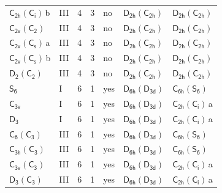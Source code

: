 \documentclass[10pt,a4paper]{article}
\numberwithin{equation}{section}
\newcommand{\grp}[1]{\mathsf{#1}}
\newcommand{\clsletter}[1]{\,{\scriptsize\color{black!55}#1}}
\begin{document}
{\begin{longtable}{@{}llrrlll@{}}
\href{C2h-S2.pdf}{$\grp{C_{2h}}(\grp{C_{i}})$}\clsletter{b} & III & 4 & 3 & no & \href{D2h-C2h.pdf}{$\grp{D_{2h}}(\grp{C_{2h}})$} & \href{D2h-C2h.pdf}{$\grp{D_{2h}}(\grp{C_{2h}})$}\\
\href{C2v-C2.pdf}{$\grp{C_{2v}}(\grp{C_{2}})$} & III & 4 & 3 & no & \href{D2h-C2h.pdf}{$\grp{D_{2h}}(\grp{C_{2h}})$} & \href{D2h-C2h.pdf}{$\grp{D_{2h}}(\grp{C_{2h}})$}\\
\href{C2v-C1v.pdf}{$\grp{C_{2v}}(\grp{C_{s}})$}\clsletter{a} & III & 4 & 3 & no & \href{D2h-C2h.pdf}{$\grp{D_{2h}}(\grp{C_{2h}})$} & \href{D2h-C2h.pdf}{$\grp{D_{2h}}(\grp{C_{2h}})$}\\
\href{C2v-C1v.pdf}{$\grp{C_{2v}}(\grp{C_{s}})$}\clsletter{b} & III & 4 & 3 & no & \href{D2h-C2h.pdf}{$\grp{D_{2h}}(\grp{C_{2h}})$} & \href{D2h-C2h.pdf}{$\grp{D_{2h}}(\grp{C_{2h}})$}\\
\href{D2-C2.pdf}{$\grp{D_{2}}(\grp{C_{2}})$} & III & 4 & 3 & no & \href{D2h-C2h.pdf}{$\grp{D_{2h}}(\grp{C_{2h}})$} & \href{D2h-C2h.pdf}{$\grp{D_{2h}}(\grp{C_{2h}})$}\\
\href{../../../rotation/data/pdf/S6.pdf}{$\grp{S_{6}}$} & I & 6 & 1 & yes & \href{D6h-D3d.pdf}{$\grp{D_{6h}}(\grp{D_{3d}})$} & \href{C6h-S6.pdf}{$\grp{C_{6h}}(\grp{S_{6}})$}\\
\href{../../../rotation/data/pdf/C3v.pdf}{$\grp{C_{3v}}$} & I & 6 & 1 & yes & \href{D6h-D3d.pdf}{$\grp{D_{6h}}(\grp{D_{3d}})$} & \href{C2h-S2.pdf}{$\grp{C_{2h}}(\grp{C_{i}})$}\clsletter{a}\\
\href{../../../rotation/data/pdf/D3.pdf}{$\grp{D_{3}}$} & I & 6 & 1 & yes & \href{D6h-D3d.pdf}{$\grp{D_{6h}}(\grp{D_{3d}})$} & \href{C2h-S2.pdf}{$\grp{C_{2h}}(\grp{C_{i}})$}\clsletter{a}\\
\href{C6-C3.pdf}{$\grp{C_{6}}(\grp{C_{3}})$} & III & 6 & 1 & yes & \href{D6h-D3d.pdf}{$\grp{D_{6h}}(\grp{D_{3d}})$} & \href{C6h-S6.pdf}{$\grp{C_{6h}}(\grp{S_{6}})$}\\
\href{C3h-C3.pdf}{$\grp{C_{3h}}(\grp{C_{3}})$} & III & 6 & 1 & yes & \href{D6h-D3d.pdf}{$\grp{D_{6h}}(\grp{D_{3d}})$} & \href{C6h-S6.pdf}{$\grp{C_{6h}}(\grp{S_{6}})$}\\
\href{C3v-C3.pdf}{$\grp{C_{3v}}(\grp{C_{3}})$} & III & 6 & 1 & yes & \href{D6h-D3d.pdf}{$\grp{D_{6h}}(\grp{D_{3d}})$} & \href{C2h-S2.pdf}{$\grp{C_{2h}}(\grp{C_{i}})$}\clsletter{a}\\
\href{D3-C3.pdf}{$\grp{D_{3}}(\grp{C_{3}})$} & III & 6 & 1 & yes & \href{D6h-D3d.pdf}{$\grp{D_{6h}}(\grp{D_{3d}})$} & \href{C2h-S2.pdf}{$\grp{C_{2h}}(\grp{C_{i}})$}\clsletter{a}\\

\end{longtable}}
\end{document}
